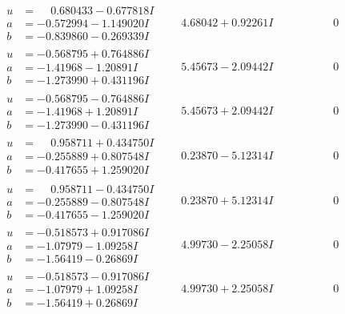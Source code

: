 \documentclass[1p]{elsarticle_modified}
\theoremstyle{definition}
\begin{document}
$$\begin{array}{c|c|c}
\begin{aligned}
u &= \phantom{-}0.680433 - 0.677818 I \\
a &= -0.572994 - 1.149020 I \\
b &= -0.839860 - 0.269339 I\end{aligned}
 & \phantom{-}4.68042 + 0.92261 I & \phantom{-0.000000 } 0 \\ \hline\begin{aligned}
u &= -0.568795 + 0.764886 I \\
a &= -1.41968 - 1.20891 I \\
b &= -1.273990 + 0.431196 I\end{aligned}
 & \phantom{-}5.45673 - 2.09442 I & \phantom{-0.000000 } 0 \\ \hline\begin{aligned}
u &= -0.568795 - 0.764886 I \\
a &= -1.41968 + 1.20891 I \\
b &= -1.273990 - 0.431196 I\end{aligned}
 & \phantom{-}5.45673 + 2.09442 I & \phantom{-0.000000 } 0 \\ \hline\begin{aligned}
u &= \phantom{-}0.958711 + 0.434750 I \\
a &= -0.255889 + 0.807548 I \\
b &= -0.417655 + 1.259020 I\end{aligned}
 & \phantom{-}0.23870 - 5.12314 I & \phantom{-0.000000 } 0 \\ \hline\begin{aligned}
u &= \phantom{-}0.958711 - 0.434750 I \\
a &= -0.255889 - 0.807548 I \\
b &= -0.417655 - 1.259020 I\end{aligned}
 & \phantom{-}0.23870 + 5.12314 I & \phantom{-0.000000 } 0 \\ \hline\begin{aligned}
u &= -0.518573 + 0.917086 I \\
a &= -1.07979 - 1.09258 I \\
b &= -1.56419 - 0.26869 I\end{aligned}
 & \phantom{-}4.99730 - 2.25058 I & \phantom{-0.000000 } 0 \\ \hline\begin{aligned}
u &= -0.518573 - 0.917086 I \\
a &= -1.07979 + 1.09258 I \\
b &= -1.56419 + 0.26869 I\end{aligned}
 & \phantom{-}4.99730 + 2.25058 I & \phantom{-0.000000 } 0 \\ \hline\begin{aligned}

\end{aligned}
\end{array}$$
\end{document}
